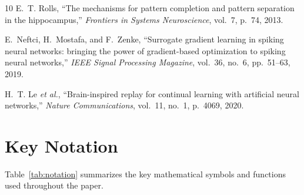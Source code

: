 \begin{thebibliography}{10}
E.~T. Rolls, ``The mechanisms for pattern completion and pattern separation in the hippocampus,'' \textit{Frontiers in Systems Neuroscience}, vol.~7, p.~74, 2013.

E.~Neftci, H.~Mostafa, and F.~Zenke, ``Surrogate gradient learning in spiking neural networks: bringing the power of gradient-based optimization to spiking neural networks,'' \textit{IEEE Signal Processing Magazine}, vol.~36, no.~6, pp.~51--63, 2019.

H.~T. Le \textit{et al.}, ``Brain-inspired replay for continual learning with artificial neural networks,'' \textit{Nature Communications}, vol.~11, no.~1, p.~4069, 2020.

\end{thebibliography}


\appendix

\section{Key Notation}

Table~\ref{tab:notation} summarizes the key mathematical symbols and functions used throughout the paper.

